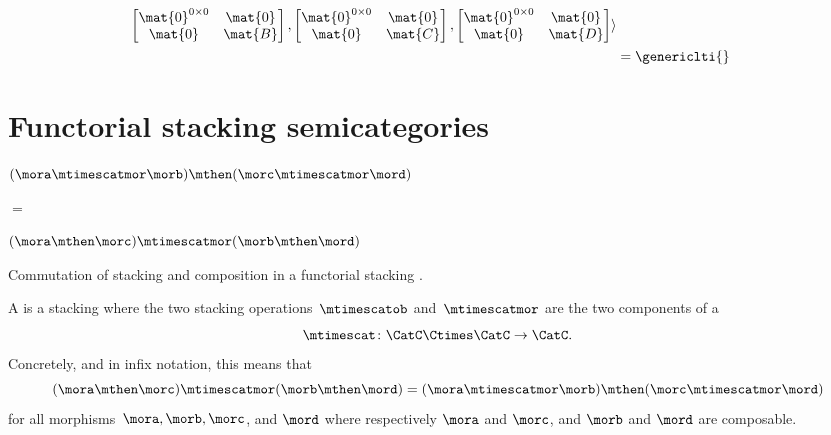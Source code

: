 \begin{example}
\begin{equation*}
\begin{aligned}
            \begin{bmatrix}\mat{0}^{0\times 0}&\mat{0}\\\mat{0}&\mat{B}\end{bmatrix},
            \begin{bmatrix}\mat{0}^{0\times 0}&\mat{0}\\\mat{0}&\mat{C}\end{bmatrix},
            \begin{bmatrix}\mat{0}^{0\times 0}&\mat{0}\\\mat{0}&\mat{D}\end{bmatrix}\rangle \\
                                                 & =\genericlti{}
        \end{aligned}
    \end{equation*}
\end{example}


\section{Functorial stacking semicategories}

\begin{marginfigure}
    \centering
    $(\mora \mtimescatmor \morb )
        \mthen (\morc \mtimescatmor \mord )$

    \vspace{3mm}

    $=$

    \vspace{3mm}
    \vspace{3mm}
    $(\mora \mthen \morc ) \mtimescatmor (\morb \mthen \mord )$

    \caption{Commutation of stacking and composition in a functorial stacking . }
    \label{fig:stacking-functorial}
\end{marginfigure}

\begin{ctdefinition}
    \label{def:functorial-stacking-semi-cat}
    A  is a stacking  where the two stacking operations~$\mtimescatob$ and~$\mtimescatmor$ are the two components of a  \begin{equation}
        \mtimescat\colon \CatC \Ctimes \CatC \to \CatC.
    \end{equation}
    Concretely, and in infix notation, this means that
    \begin{equation}
        (\mora \mthen \morc )
        \mtimescatmor (\morb \mthen \mord )
        =
        (\mora \mtimescatmor \morb )
        \mthen (\morc \mtimescatmor \mord )
    \end{equation}
    for all morphisms~$\mora, \morb, \morc$, and $\mord$ where respectively $\mora$ and $\morc$, and $\morb$ and $\mord$ are composable.
\end{ctdefinition}

